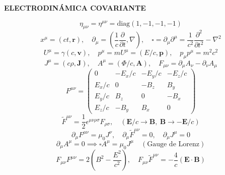\documentclass[twocolumn]{article}
\begin{document}
	\begin{center}\textbf{\footnotesize ELECTRODINÁMICA COVARIANTE}\end{center}
	\vspace{-2mm}
	\begin{equation*}
		\eta_{\mu\nu} = \eta^{\mu\nu} = \text{diag}(1, -1, -1, -1)
	\end{equation*}
	\begin{equation*}
		x^\mu = (ct, \mathbf{r}), \quad \partial_\mu = \left(\frac{1}{c}\frac{\partial}{\partial t}, \nabla\right), \quad \square = \partial_\mu\partial^\mu = \frac{1}{c^2}\frac{\partial^2}{\partial t^2} - \nabla^2
	\end{equation*}
	\begin{equation*}
		U^\mu = \gamma(c, \mathbf{v}), \quad p^\mu = m U^\mu = (E/c, \mathbf{p}), \quad p_\mu p^\mu = m^2 c^2
	\end{equation*}
	\begin{equation*}
		J^\mu = (c\rho, \mathbf{J}), \quad A^\mu = (\Phi/c, \mathbf{A}), \quad F_{\mu\nu} = \partial_\mu A_\nu - \partial_\nu A_\mu
	\end{equation*}
	\begin{equation*}
		F^{\mu\nu} = \begin{pmatrix} 0 & -E_x/c & -E_y/c & -E_z/c \\ E_x/c & 0 & -B_z & B_y \\ E_y/c & B_z & 0 & -B_x \\ E_z/c & -B_y & B_x & 0 \end{pmatrix}
	\end{equation*}
	\begin{equation*}
		\tilde{F}^{\mu\nu} = \frac{1}{2}\epsilon^{\mu\nu\rho\sigma}F_{\rho\sigma}, \quad (\mathbf{E}/c \to \mathbf{B}, \ \mathbf{B} \to -\mathbf{E}/c)
	\end{equation*}
	\begin{equation*}
		\partial_\mu F^{\mu\nu} = \mu_0 J^\nu, \quad \partial_\mu \tilde{F}^{\mu\nu} = 0, \quad \partial_\mu J^\mu = 0
	\end{equation*}
	\begin{equation*}
		\partial_\mu A^\mu = 0 \implies \square A^\mu = \mu_0 J^\mu \quad (\text{Gauge de Lorenz})
	\end{equation*}
	\begin{equation*}
		F_{\mu\nu}F^{\mu\nu} = 2\left(B^2 - \frac{E^2}{c^2}\right), \quad F_{\mu\nu}\tilde{F}^{\mu\nu} = -\frac{4}{c}(\mathbf{E}\cdot\mathbf{B})
	\end{equation*}
	
\end{document}
